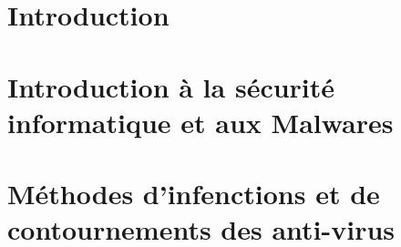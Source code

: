 \documentclass[12pt]{report}
\begin{document}


\renewcommand{\contentsname}{Sommaire}
\tableofcontents
\listoffigures
\listoftables

\chapter*{Introduction}



\chapter{Introduction à la sécurité informatique et aux Malwares}


\chapter{Méthodes d'infenctions et de contournements des anti-virus}

\end{document}
